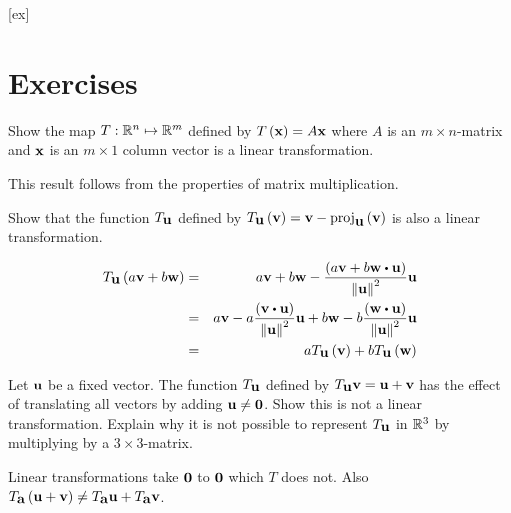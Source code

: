 [ex]
\section*{Exercises}

\begin{enumialphparenastyle}

\begin{ex} Show the map $T:\mathbb{R}^{n}\mapsto \mathbb{R}^{m}$ defined by 
$T\left(\mbox{\bf x} \right) =A\mbox{\bf x}$ where $A$ is an $m\times n$-matrix
and $\mbox{\bf x}$ is an $m\times 1$ column vector is a linear transformation. 
\begin{sol}
This result follows from the properties of matrix multiplication.
\end{sol}
\end{ex}

\begin{ex} Show that the function $T_{\mbox{\bf u}}$ defined by $T_{\mbox{\bf u}}
\left(\mbox{\bf v}\right) = \mbox{\bf v}-\mbox{\rm proj}_{\mbox{\bf u}}\left(
\mbox{\bf v}\right) $ is also a linear transformation.
\begin{sol}
\begin{eqnarray*}
T_{\vect{u}}\tup{a\vect{v}+b\vect{w}} &=&a\vect{v}+b\vect{w}-\frac{\tup{a\vect{v}+b\vect{w}\dotprod \vect{u}} }{\norm{\vect{u}
} ^{2}}\vect{u} \\
&=&a\vect{v}-a\frac{\tup{\vect{v}\dotprod \vect{u}} }{\norm{\vect{u}} ^{2}}\vect{u}+b\vect{w}-b\frac{\tup{\vect{w}\dotprod \vect{u}
} }{\norm{\vect{u}} ^{2}}\vect{u} \\
&=&aT_{\vect{u}}\tup{\vect{v}} +bT_{\vect{u}}\tup{\vect{w}
}
\end{eqnarray*}
\end{sol}
\end{ex}

\begin{ex} Let $\mbox{\bf u}$ be a fixed vector. The function 
$T_{\mbox{\bf u}}$ defined by $T_{\mbox{\bf u}}\mbox{\bf v}=\mbox{\bf u}+\mbox{\bf v}$ has the effect of
translating all vectors by adding $\mbox{\bf u}\neq \mbox{\bf 0}$. Show this is not a
linear transformation. Explain why it is not possible to represent 
$T_{\mbox{\bf u}}$ in $\mathbb{R}^{3}$ by multiplying by a $3\times 3$-matrix.
\begin{sol}
Linear
transformations take $\mbox{\bf 0}$ to $\mbox{\bf 0}$ which $T$ does not. Also $T_{\mbox{\bf a}}\left(\mbox{\bf u}+\mbox{\bf v}\right) \neq T_{\mbox{\bf a}}\mbox{\bf u}+T_{\mbox{\bf a}}
\mbox{\bf v}$.
\end{sol}
\end{ex}

\end{enumialphparenastyle}